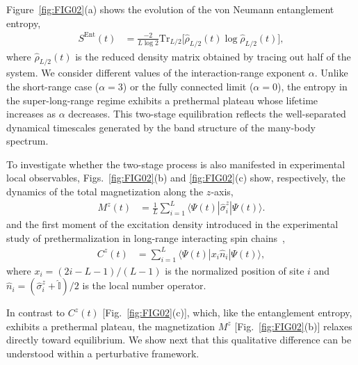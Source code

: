 \documentclass[aps,prl,amsfonts,floatfix,superscriptaddress,longbibliography,twocolumn,footinbib]{revtex4-2}
\begin{document}
Figure~\ref{fig:FIG02}(a) shows the evolution of the von Neumann  entanglement entropy,
\begin{align}
    S^\mathrm{Ent} (t) &= \frac{-2}{L \log 2} \mathrm{Tr}_{L/2} \biggl[ \hat{\rho}_{L/2} (t) \log \hat{\rho}_{L/2} (t) \biggr],
    \label{Eq:Sent}
\end{align}
where $\hat{\rho}_{L/2}(t)$ is the reduced density matrix obtained by tracing out half of the system. We consider different values of the interaction-range exponent $\alpha$. Unlike the short-range case ($\alpha=3$) or the fully connected limit ($\alpha=0$), the entropy in the super-long-range regime exhibits a prethermal plateau whose lifetime increases as $\alpha$ decreases. This two-stage equilibration reflects the well-separated dynamical timescales generated by the band structure of the many-body spectrum.

To investigate whether the two-stage process is also manifested in experimental local observables,
Figs.~\ref{fig:FIG02}(b) and \ref{fig:FIG02}(c) show, respectively, the dynamics of the total magnetization along the $z$-axis,
\begin{align}
    M^z(t) &= \frac{1}{L} \sum_{i=1}^{L}
    \langle \Psi(t)| \hat{\sigma}_i^z | \Psi(t) \rangle.
    \label{Eq:Mz}
\end{align} 
and the first moment of the excitation density introduced in the experimental study of prethermalization in long-range interacting spin chains~\cite{Neyenhuise2017},
\begin{align}
    C^z(t)
    &= \sum_{i=1}^{L}
    \langle\Psi(t)|x_i\hat{n}_i|\Psi(t)\rangle,
    \label{Eq:Cz}
\end{align}
where
$x_i=(2i-L-1)/(L-1)$
is the normalized position of site $i$ and
$\hat{n}_i=(\hat{\sigma}_i^z+\hat{\mathbb I})/2 $
is the local number operator.

In contrast to $C^z(t)$ [Fig.~\ref{fig:FIG02}(c)], which, like the entanglement entropy, exhibits a prethermal plateau, the magnetization $M^z$ [Fig.~\ref{fig:FIG02}(b)] relaxes directly toward equilibrium. We show next that this qualitative difference can be understood within a perturbative framework.
\end{document}
